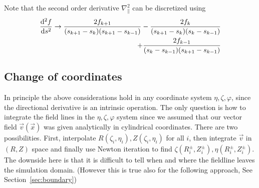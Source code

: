 Note that the second order derivative $\nabla_\parallel^2$ can be
discretized using
\begin{align}\label{eq:second_order}
    \frac{\mathrm{d}^2 f}{\mathrm{d} s^2} \rightarrow
     \frac{2f_{k+1}}{(s_{k+1}-s_k)(s_{k+1}-s_{k-1})}
    -\frac{2f_{k}}{(s_{k+1}-s_k)(s_{k}-s_{k-1})} \nonumber\\
    +\frac{2f_{k-1}}{(s_{k}-s_{k-1})(s_{k+1}-s_{k-1})}
\end{align}

\subsection{Change of coordinates}
In principle the above considerations hold in any
coordinate system $\eta,\zeta,\varphi$, since the directional derivative is
an intrinsic operation.
The only question is how to integrate the field lines in the
$\eta, \zeta,\varphi$ system
since we assumed that our vector field $\vec v(\vec x)$ was given
analytically in
cylindrical coordinates. There are two possibilities.
First, interpolate $R(\zeta_i, \eta_i), Z(\zeta_i, \eta_i)$ for
all $i$, then integrate $\vec v$ in $(R,Z)$ space and finally use
Newton iteration to find $\zeta(R^\pm_i, Z^\pm_i), \eta(R^\pm_i, Z^\pm_i)$.
The downside here is that it is difficult to tell when and where the fieldline leaves the simulation domain. (However this is true also for the
following approach, See Section~\ref{sec:boundary})

